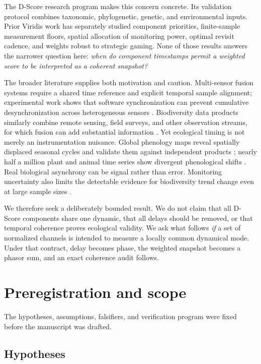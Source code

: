 \documentclass[10pt]{article}
\begin{document}
The D-Score research program makes this concern concrete.  Its validation
protocol combines taxonomic, phylogenetic, genetic, and environmental inputs.
Prior Viridis work has separately studied component priorities, finite-sample
measurement floors, spatial allocation of monitoring power, optimal revisit
cadence, and weights robust to strategic gaming.  None of those results answers
the narrower question here: \emph{when do component timestamps permit a
weighted score to be interpreted as a coherent snapshot?}

The broader literature supplies both motivation and caution.  Multi-sensor
fusion systems require a shared time reference and explicit temporal sample
alignment; experimental work shows that software synchronization can prevent
cumulative desynchronization across heterogeneous sensors
\cite{piatkowski2025}.  Biodiversity data products similarly combine remote
sensing, field surveys, and other observation streams, for which fusion can add
substantial information \cite{schulte2018}.  Yet ecological timing is not merely
an instrumentation nuisance.  Global phenology maps reveal spatially displaced
seasonal cycles and validate them against independent products
\cite{terasakihart2025}; nearly half a million plant and animal time series show
divergent phenological shifts \cite{lang2025}.  Real biological asynchrony can be
signal rather than error.  Monitoring uncertainty also limits the detectable
evidence for biodiversity trend change even at large sample sizes
\cite{leung2024}.

We therefore seek a deliberately bounded result.  We do not claim that all
D-Score components share one dynamic, that all delays should be removed, or that
temporal coherence proves ecological validity.  We ask what follows \emph{if}
a set of normalized channels is intended to measure a locally common dynamical
mode.  Under that contract, delay becomes phase, the weighted snapshot becomes
a phasor sum, and an exact coherence audit follows.

\section{Preregistration and scope}

The hypotheses, assumptions, falsifiers, and verification program were fixed
before the manuscript was drafted.

\subsection{Hypotheses}
\end{document}

